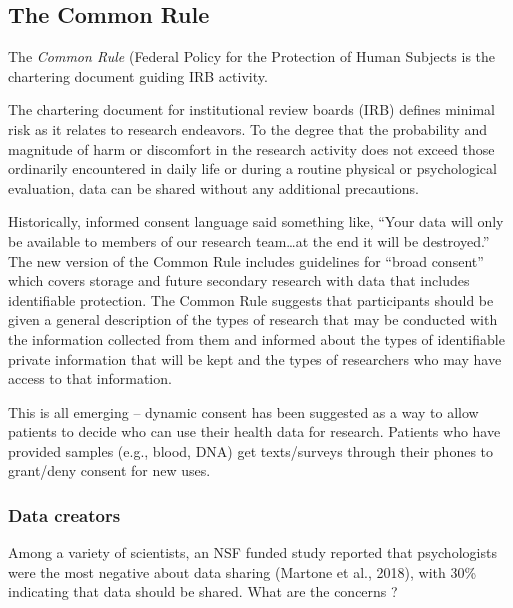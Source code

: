 \documentclass[
  english,
]{book}
\begin{document}
\hypertarget{the-common-rule}{%
\subsection{The Common Rule}\label{the-common-rule}}

The \emph{Common Rule} (Federal Policy for the Protection of Human Subjects \citep{noauthor_federal_2009} is the chartering document guiding IRB activity.

The chartering document for institutional review boards (IRB) defines minimal risk as it relates to research endeavors. To the degree that the probability and magnitude of harm or discomfort in the research activity does not exceed those ordinarily encountered in daily life or during a routine physical or psychological evaluation, data can be shared without any additional precautions.

Historically, informed consent language said something like, ``Your data will only be available to members of our research team\ldots at the end it will be destroyed.'' The new version of the Common Rule \citep{protections_ohrp_revised_2017} includes guidelines for ``broad consent'' which covers storage and future secondary research with data that includes identifiable protection. The Common Rule suggests that participants should be given a general description of the types of research that may be conducted with the information collected from them and informed about the types of identifiable private information that will be kept and the types of researchers who may have access to that information.

This is all emerging -- dynamic consent has been suggested as a way to allow patients to decide who can use their health data for research. Patients who have provided samples (e.g., blood, DNA) get texts/surveys through their phones to grant/deny consent for new uses.

\hypertarget{data-creators}{%
\subsubsection{Data creators}\label{data-creators}}

Among a variety of scientists, an NSF funded study reported that psychologists were the most negative about data sharing (Martone et al., 2018), with 30\% indicating that data should be shared. What are the concerns \citep{martone_data_2018}?
\end{document}
